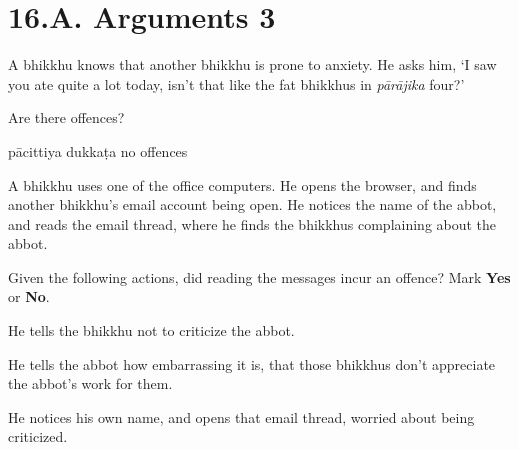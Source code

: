 \chapter{16.A. Arguments 3}
\renewcommand*{\theChapterTitle}{16.A. Arguments 3}

\begin{exam}{\autoExamName}

  \begin{problem}

    A bhikkhu knows that another bhikkhu is prone to anxiety. He asks him, `I
    saw you ate quite a lot today, isn't that like the fat bhikkhus in
    \textit{pārājika} four?'

    Are there offences?

    \bigskip

    \begin{answers}{3}
      \bChoices
       pācittiya\eAns
       dukkaṭa\eAns
       no offences\eAns
      \eChoices
    \end{answers}

  \end{problem}

  \problemDivide

  \begin{problem*}

    A bhikkhu uses one of the office computers. He opens the browser, and finds
    another bhikkhu's email account being open. He notices the name of the
    abbot, and reads the email thread, where he finds the bhikkhus complaining
    about the abbot.

    \bigskip

    Given the following actions, did reading the messages incur an offence? Mark \textbf{Yes} or \textbf{No}.

    \bigskip

      \begin{parts}
      \item {} He tells the bhikkhu not to criticize the abbot.

      \item {} He tells the abbot how embarrassing it is, that those
        bhikkhus don't appreciate the abbot's work for them.
        
      \item {} He notices his own name, and opens that email thread, worried
        about being criticized.
      \end{parts}

  \end{problem*}


\end{exam}
